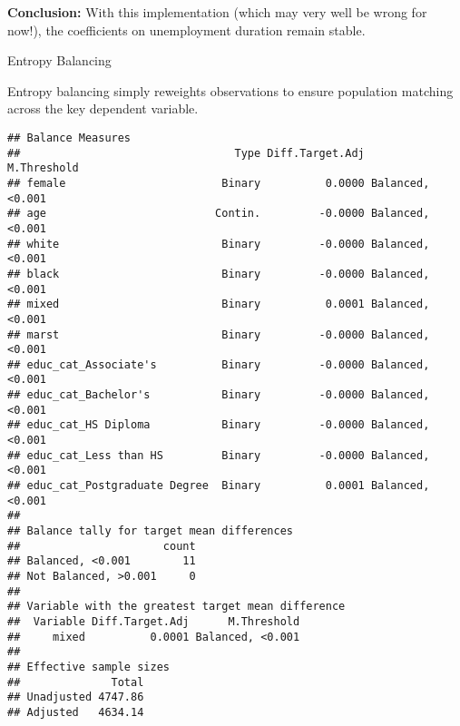 \textbf{Conclusion:} With this implementation (which may very well be
wrong for now!), the coefficients on unemployment duration remain
stable.

Entropy Balancing

Entropy balancing simply reweights observations to ensure population
matching across the key dependent variable.

\begin{Shaded}
\begin{Highlighting}[]
\OtherTok{\textless{}{-}} \NormalTok{(}
  \SpecialCharTok{\textasciitilde{}}\SpecialCharTok{+}\SpecialCharTok{+}\SpecialCharTok{+}\SpecialCharTok{+}\SpecialCharTok{+}\SpecialCharTok{+}
   \NormalTok{,}
  \SpecialCharTok{$}
\NormalTok{)}

 \NormalTok{(}\NormalTok{, }\NormalTok{), } \NormalTok{(}\NormalTok{))}
\end{Highlighting}
\end{Shaded}

\begin{verbatim}
## Balance Measures
##                                 Type Diff.Target.Adj      M.Threshold
## female                        Binary          0.0000 Balanced, <0.001
## age                          Contin.         -0.0000 Balanced, <0.001
## white                         Binary         -0.0000 Balanced, <0.001
## black                         Binary         -0.0000 Balanced, <0.001
## mixed                         Binary          0.0001 Balanced, <0.001
## marst                         Binary         -0.0000 Balanced, <0.001
## educ_cat_Associate's          Binary         -0.0000 Balanced, <0.001
## educ_cat_Bachelor's           Binary         -0.0000 Balanced, <0.001
## educ_cat_HS Diploma           Binary         -0.0000 Balanced, <0.001
## educ_cat_Less than HS         Binary         -0.0000 Balanced, <0.001
## educ_cat_Postgraduate Degree  Binary          0.0001 Balanced, <0.001
## 
## Balance tally for target mean differences
##                      count
## Balanced, <0.001        11
## Not Balanced, >0.001     0
## 
## Variable with the greatest target mean difference
##  Variable Diff.Target.Adj      M.Threshold
##     mixed          0.0001 Balanced, <0.001
## 
## Effective sample sizes
##              Total
## Unadjusted 4747.86
## Adjusted   4634.14
\end{verbatim}

